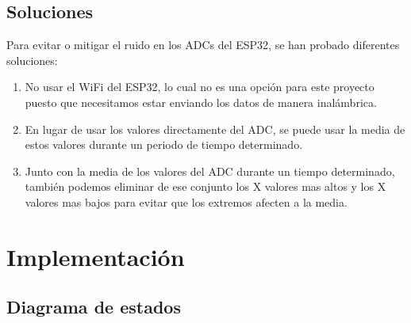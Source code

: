 \begin{titlepage}
\subsection{Soluciones}
Para evitar o mitigar el ruido en los ADCs del ESP32, se han probado diferentes soluciones:
\begin{enumerate}
	\item No usar el WiFi del ESP32, lo cual no es una opción para este proyecto puesto que necesitamos estar enviando los datos de manera inalámbrica.
	\item En lugar de usar los valores directamente del ADC, se puede usar la media de estos valores durante un periodo de tiempo determinado.
	\item Junto con la media de los valores del ADC durante un tiempo determinado, también podemos eliminar de ese conjunto los X valores mas altos y los X valores mas bajos para evitar que los extremos afecten a la media.
\end{enumerate}

\section{Implementación}
\subsection{Diagrama de estados}

\end{titlepage}
